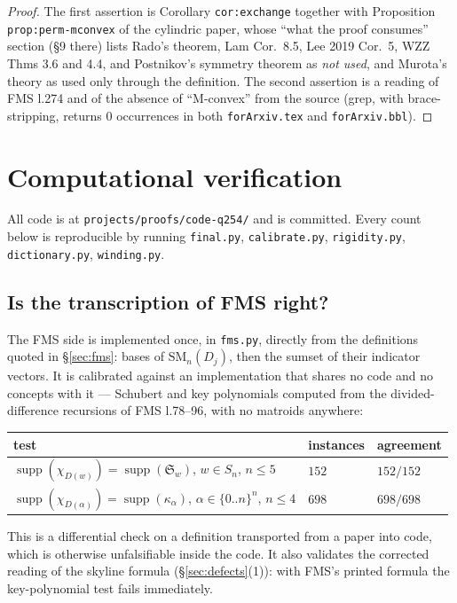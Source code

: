\documentclass[11pt]{article}
\theoremstyle{definition}
\DeclareMathOperator{\supp}{supp}
\newcommand{\SM}{\mathrm{SM}}
\begin{document}
\begin{proof}
The first assertion is Corollary \texttt{cor:exchange} together with Proposition
\texttt{prop:perm-mconvex} of the cylindric paper, whose ``what the proof consumes'' section
(\S9 there) lists Rado's theorem, Lam Cor.~8.5, Lee 2019 Cor.~5, WZZ Thms 3.6 and 4.4, and
Postnikov's symmetry theorem as \emph{not used}, and Murota's theory as used only through the
definition. The second assertion is a reading of FMS l.274 and of the absence of ``M-convex''
from the source (grep, with brace-stripping, returns $0$ occurrences in both
\texttt{forArxiv.tex} and \texttt{forArxiv.bbl}).
\end{proof}

\section{Computational verification}\label{sec:verify}

All code is at \texttt{projects/proofs/code-q254/} and is committed. Every count below is
reproducible by running \texttt{final.py}, \texttt{calibrate.py}, \texttt{rigidity.py},
\texttt{dictionary.py}, \texttt{winding.py}.

\subsection{Is the transcription of FMS right?}\label{sec:calib}

The FMS side is implemented once, in \texttt{fms.py}, directly from the definitions quoted in
\S\ref{sec:fms}: bases of $\SM_n(D_j)$, then the sumset of their indicator vectors. It is
calibrated against an implementation that shares no code and no concepts with it ---
Schubert and key polynomials computed from the divided-difference recursions of FMS l.78--96,
with no matroids anywhere:

\begin{center}
\begin{tabular}{lll}
\toprule
test & instances & agreement \\
\midrule
$\supp(\chi_{D(w)})=\supp(\mathfrak{S}_w)$, $w\in S_n$, $n\le5$ & $152$ & $152/152$\\
$\supp(\chi_{D(\alpha)})=\supp(\kappa_\alpha)$, $\alpha\in\{0..n\}^n$, $n\le4$ & $698$ & $698/698$\\
\bottomrule
\end{tabular}
\end{center}

This is a differential check on a definition transported from a paper into code, which is
otherwise unfalsifiable inside the code. It also validates the corrected reading of the skyline
formula (\S\ref{sec:defects}(1)): with FMS's printed formula the key-polynomial test fails
immediately.
\end{document}
